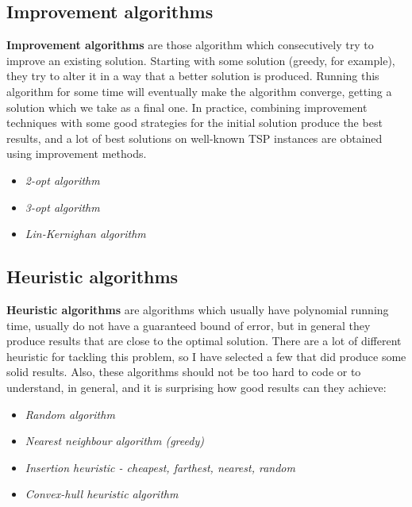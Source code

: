 \documentclass[12pt,twoside,notitlepage]{report}
\begin{document}
\subsection{Improvement algorithms}

{\bf Improvement algorithms} are those algorithm which consecutively try to improve an existing solution. Starting with some solution (greedy, for example), they try to alter it in a way that a better solution is produced. Running this algorithm for some time will eventually make the algorithm converge, getting a solution which we take as a final one. In practice, combining improvement techniques with some good strategies for the initial solution produce the best results, and a lot of best solutions on well-known TSP instances are obtained using improvement methods.

\begin{itemize}

\item {\it 2-opt algorithm}
\item {\it 3-opt algorithm}
\item {\it Lin-Kernighan algorithm}

\end{itemize}

\subsection{Heuristic algorithms}

{\bf Heuristic algorithms} are algorithms which usually have polynomial running time, usually do not have a guaranteed bound of error, but in general they produce results that are close to the optimal solution. There are a lot of different heuristic for tackling this problem, so I have selected a few that did produce some solid results. Also, these algorithms should not be too hard to code or to understand, in general, and it is surprising how good results can they achieve:

\begin{itemize}

\item {\it Random algorithm}
\item {\it Nearest neighbour algorithm (greedy)}
\item {\it Insertion heuristic - cheapest, farthest, nearest, random}
\item {\it Convex-hull heuristic algorithm}

\end{itemize}
\end{document}
